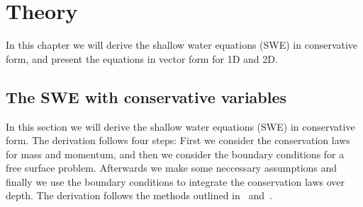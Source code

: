 \chapter{Theory}
In this chapter we will derive the shallow water equations (SWE) in conservative form, and present the equations in vector form for 1D and 2D.



\section{The SWE with conservative variables}
In this section we will derive the shallow water equations (SWE) in conservative form.
The derivation follows four steps: First we consider the conservation laws for mass and momentum, and then we consider the boundary conditions for a free surface problem.
Afterwards we make some neccessary assumptions and finally we use the boundary conditions to integrate the conservation laws over depth.
The derivation follows the methods outlined in~\cite{Toro2001-Shock} and~\cite{Vreugdenhil1994}.

